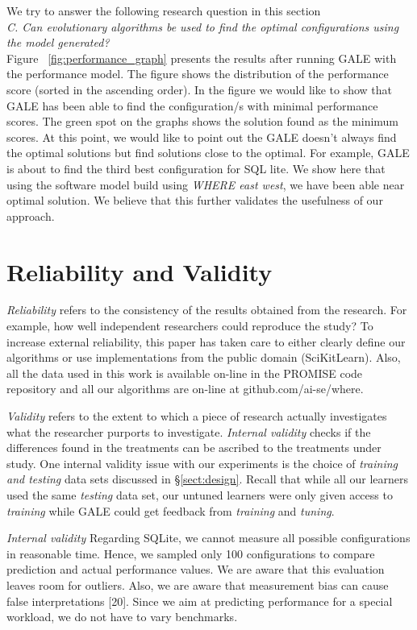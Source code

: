 \documentclass{sig-alternative}
\newcommand{\tion}[1]{\S\ref{sect:#1}}
\begin{document}
We try to answer the following research question in this section\\

\textit{C. Can evolutionary algorithms be used to find the optimal
configurations using the model generated?}
\\
Figure ~\ref{fig:performance_graph} presents the results after running GALE with the performance model. The figure shows the distribution of the performance score (sorted in the ascending order). In the figure we would like to show that GALE has been able to find the configuration/s with minimal performance scores. The green spot on the graphs shows the solution found as the minimum scores. At this point, we would like to point out the GALE doesn't always find the optimal solutions but find solutions close to the optimal. For example, GALE is about to find the third best configuration for SQL lite. We show here that using the software model build using \textit{WHERE east west}, we have been able near optimal solution. We believe that this further validates the usefulness of our approach.  


 
 
\section{Reliability and Validity}\label{sect:construct}


{\em Reliability} refers to the consistency of the results obtained
from the research.  For example,   how well independent researchers
could reproduce the study? To increase external
reliability, this paper has taken care to either  clearly define our
algorithms or use implementations from the public domain
(SciKitLearn). Also, all the data used in this work is available
on-line in the PROMISE code repository and all our algorithms
are on-line at github.com/ai-se/where.


{\em Validity} refers to the extent to which a piece of research actually
investigates what the researcher purports to investigate.
{\em Internal validity} checks if the differences found in
the treatments can be ascribed to the treatments under study. 
One internal validity issue with our experiments is the choice
of {\em training and testing} data sets discussed in 
\tion{design}. Recall that while all our learners used the same
{\em testing} data set, our untuned learners were only given
access to {\em training} while GALE could get feedback from
{\em training} and
{\em tuning}.  

{\em Internal validity}
Regarding SQLite, we cannot measure all possible configurations in reasonable time. Hence, we sampled only 100 configurations to compare prediction and actual performance values. We are aware that this evaluation leaves room for outliers.
Also, we are aware that measurement bias can cause false interpretations [20]. Since we aim at predicting performance for a special workload, we do not have to vary benchmarks.
\end{document}
